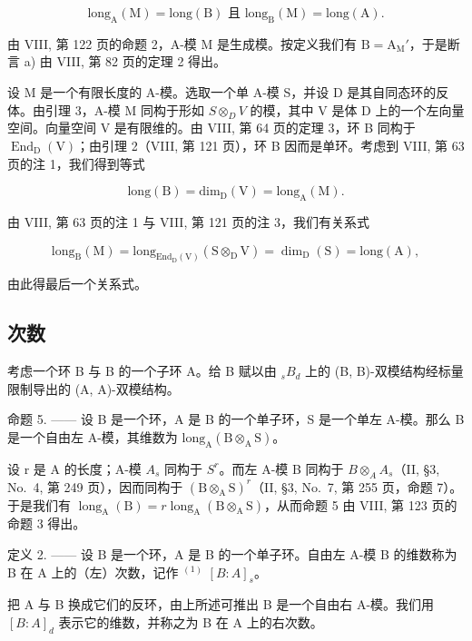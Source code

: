 \[
\mathrm{long} _ {\mathrm{A}} (\mathrm{M}) = \mathrm{long} (\mathrm{B}) \text{ 且 } \mathrm{long} _ {\mathrm{B}} (\mathrm{M}) = \mathrm{long} (\mathrm{A}).\tag{2}
\]

由 VIII, 第 122 页的命题 2，A-模 M 是生成模。按定义我们有 \(\mathrm{B} = \mathrm{A}_{\mathrm{M}}'\)，于是断言 a) 由 VIII, 第 82 页的定理 2 得出。

设 M 是一个有限长度的 A-模。选取一个单 A-模 S，并设 D 是其自同态环的反体。由引理 3，A-模 M 同构于形如 \(S \otimes_{D} V\) 的模，其中 V 是体 D 上的一个左向量空间。向量空间 V 是有限维的。由 VIII, 第 64 页的定理 3，环 B 同构于 \(\operatorname{End}_{\mathrm{D}}(\mathrm{V})\)；由引理 2（VIII, 第 121 页），环 B 因而是单环。考虑到 VIII, 第 63 页的注 1，我们得到等式

\[
\mathrm{long(B)} = \mathrm {dim_ {D} (V)} = \mathrm {long_ {A} (M)}.
\]

由 VIII, 第 63 页的注 1 与 VIII, 第 121 页的注 3，我们有关系式

\[
\mathrm{long} _ {\mathrm{B}} (\mathrm{M}) = \mathrm{long} _ {\mathrm{End} _ {\mathrm{D}} (\mathrm{V})} (\mathrm{S} \otimes_ {\mathrm{D}} \mathrm{V}) = \dim_ {\mathrm{D}} (\mathrm{S}) = \mathrm{long} (\mathrm{A}),
\]

由此得最后一个关系式。

\subsection{次数}

考虑一个环 B 与 B 的一个子环 A。给 B 赋以由 \(_{s}B_{d}\) 上的 (B, B)-双模结构经标量限制导出的 (A, A)-双模结构。

命题 5. —— 设 B 是一个环，A 是 B 的一个单子环，S 是一个单左 A-模。那么 B 是一个自由左 A-模，其维数为 \(\text{long}_{\text{A}}(\text{B} \otimes_{\text{A}} \text{S})\)。

设 r 是 A 的长度；A-模 \(A_{s}\) 同构于 \(S^{r}\)。而左 A-模 B 同构于 \(B \otimes_{A} A_{s}\)（II, §3, No.~4, 第 249 页），因而同构于 \((\mathrm{B} \otimes_{\mathrm{A}} \mathrm{S})^{r}\)（II, §3, No.~7, 第 255 页，命题 7）。于是我们有 \(\operatorname{long}_{\mathrm{A}}(\mathrm{B}) = r \operatorname{long}_{\mathrm{A}}(\mathrm{B} \otimes_{\mathrm{A}} \mathrm{S})\)，从而命题 5 由 VIII, 第 123 页的命题 3 得出。

定义 2. —— 设 B 是一个环，A 是 B 的一个单子环。自由左 A-模 B 的维数称为 B 在 A 上的（左）次数，记作 \(^{(1)}\) \([B:A]_{s}\)。

把 A 与 B 换成它们的反环，由上所述可推出 B 是一个自由右 A-模。我们用 \([B : A]_{d}\) 表示它的维数，并称之为 B 在 A 上的右次数。

